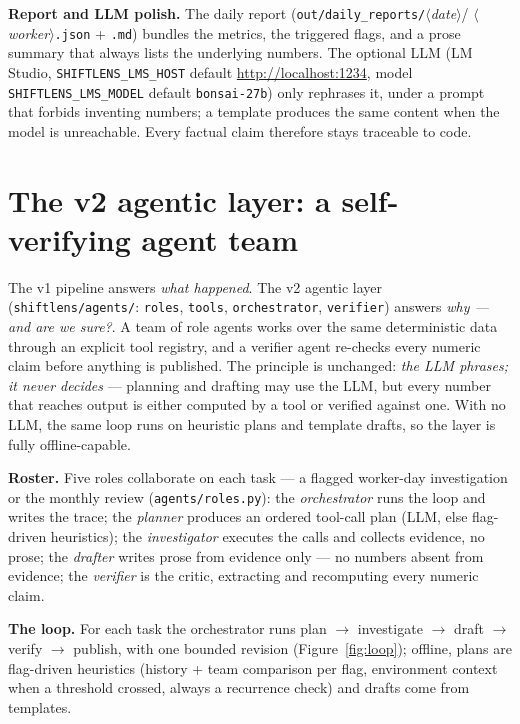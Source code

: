 \documentclass[11pt,a4paper]{article}
\begin{document}
\textbf{Report and LLM polish.} The daily report
(\texttt{out/daily\_reports/}$\langle$\textit{date}$\rangle$/%
$\langle$\textit{worker}$\rangle$\texttt{.json} + \texttt{.md}) bundles the
metrics, the triggered flags, and a prose summary that always lists the
underlying numbers. The optional LLM (LM Studio,
\texttt{SHIFTLENS\_LMS\_HOST} default \url{http://localhost:1234}, model
\texttt{SHIFTLENS\_LMS\_MODEL} default \texttt{bonsai-27b}) only rephrases
it, under a prompt that forbids inventing numbers; a template produces the
same content when the model is unreachable. Every factual claim therefore
stays traceable to code.

\section{The v2 agentic layer: a self-verifying agent team}
\label{sec:agents}
The v1 pipeline answers \emph{what happened}. The v2 agentic layer
(\texttt{shiftlens/agents/}: \texttt{roles}, \texttt{tools},
\texttt{orchestrator}, \texttt{verifier}) answers \emph{why --- and are we
sure?}. A team of role agents works over the same deterministic data
through an explicit tool registry, and a verifier agent re-checks every
numeric claim before anything is published. The principle is unchanged:
\emph{the LLM phrases; it never decides} --- planning and drafting may use
the LLM, but every number that reaches output is either computed by a tool
or verified against one. With no LLM, the same loop runs on heuristic plans
and template drafts, so the layer is fully offline-capable.

\textbf{Roster.} Five roles collaborate on each task --- a flagged
worker-day investigation or the monthly review
(\texttt{agents/roles.py}): the \emph{orchestrator} runs the loop and
writes the trace; the \emph{planner} produces an ordered tool-call plan
(LLM, else flag-driven heuristics); the \emph{investigator} executes the
calls and collects evidence, no prose; the \emph{drafter} writes prose
from evidence only --- no numbers absent from evidence; the
\emph{verifier} is the critic, extracting and recomputing every numeric
claim.

\textbf{The loop.} For each task the orchestrator runs
plan $\to$ investigate $\to$ draft $\to$ verify $\to$ publish, with one
bounded revision (Figure~\ref{fig:loop}); offline, plans are flag-driven
heuristics (history + team comparison per flag, environment context when a
threshold crossed, always a recurrence check) and drafts come from
templates.
\end{document}
